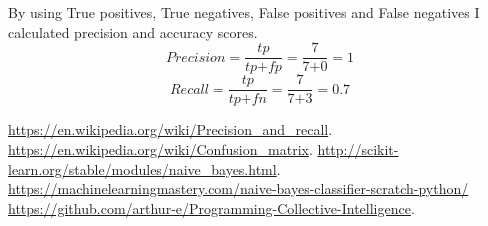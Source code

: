 \documentclass[letterpaper,11pt]{article}
\begin{document}
	By using True positives, True negatives, False positives and False negatives I calculated  precision and accuracy scores.
	\[Precision 
	= \dfrac{tp}{tp\texttt{+}fp}
  	= \dfrac{7}{7\texttt{+}0}
	=1
\]
\[Recall  
 	 = \dfrac{tp}{tp\texttt{+}fn}
  	= \dfrac{7}{7\texttt{+}3}	
	=0.7
\]

\clearpage



\begin{thebibliography}{9}
\bibitem{}
\url{https://en.wikipedia.org/wiki/Precision_and_recall}.
\bibitem{}
\url{https://en.wikipedia.org/wiki/Confusion_matrix}.
\bibitem{}
 \url{http://scikit-learn.org/stable/modules/naive_bayes.html}.
\bibitem{}
\url{https://machinelearningmastery.com/naive-bayes-classifier-scratch-python/}
\bibitem{}
 \url{https://github.com/arthur-e/Programming-Collective-Intelligence}.
\end{thebibliography}
\end{document}
